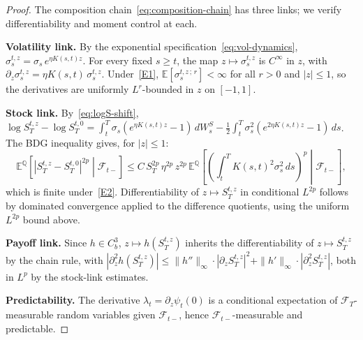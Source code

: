 \documentclass[11pt,a4paper]{article}
\theoremstyle{plain}
\theoremstyle{definition}
\theoremstyle{remark}
\newcommand{\E}{\mathbb{E}}
\newcommand{\QQ}{\mathbb{Q}}
\newcommand{\F}{\mathcal{F}}
\begin{document}
\begin{proof}
The composition chain~\eqref{eq:composition-chain} has
three links; we verify differentiability and moment
control at each.

\textbf{Volatility link.}  By the exponential
specification~\eqref{eq:vol-dynamics},
$\sigma_s^{t,z} = \sigma_s\,e^{\eta K(s,t)z}$.
For every fixed $s \geq t$, the map $z \mapsto
\sigma_s^{t,z}$ is $C^\infty$ in $z$, with
$\partial_z \sigma_s^{t,z} = \eta K(s,t)\,\sigma_s^{t,z}$.
Under~\ref{E1}, $\E[\sigma_s^{t,z\,;\,r}] < \infty$ for
all $r > 0$ and $|z| \leq 1$, so the derivatives
are uniformly $L^r$-bounded in $z$ on $[-1,1]$.

\textbf{Stock link.}  By~\eqref{eq:logS-shift},
$\log S_T^{t,z} - \log S_T^{t,0}
= \int_t^T \sigma_s(e^{\eta K(s,t)z}-1)\,dW_s^S
- \frac{1}{2}\int_t^T \sigma_s^2(e^{2\eta K(s,t)z}-1)\,ds$.
The BDG inequality gives, for $|z| \leq 1$:
\[
  \E^{\QQ}\!\left[\left.
  |S_T^{t,z} - S_T^{t,0}|^{2p}\;\right|\;\F_{t-}\right]
  \leq C\,S_T^{2p}\,\eta^{2p}\,z^{2p}\,
  \E^{\QQ}\!\left[\left.
  \left(\int_t^T K(s,t)^2\sigma_s^2\,ds\right)^p
  \;\right|\;\F_{t-}\right],
\]
which is finite under~\ref{E2}.  Differentiability
of $z \mapsto S_T^{t,z}$ in conditional $L^{2p}$
follows by dominated convergence applied to the
difference quotients, using the uniform $L^{2p}$
bound above.

\textbf{Payoff link.}  Since $h \in C_b^3$,
$z \mapsto h(S_T^{t,z})$ inherits the differentiability
of $z \mapsto S_T^{t,z}$ by the chain rule, with
$|\partial_z^2 h(S_T^{t,z})| \leq \|h''\|_\infty
\cdot |\partial_z S_T^{t,z}|^2
+ \|h'\|_\infty \cdot |\partial_z^2 S_T^{t,z}|$,
both in $L^p$ by the stock-link estimates.

\textbf{Predictability.}  The derivative
$\lambda_t = \partial_z \psi_t(0)$ is a conditional
expectation of $\F_T$-measurable random variables given
$\F_{t-}$, hence $\F_{t-}$-measurable and predictable.
\end{proof}
\end{document}
